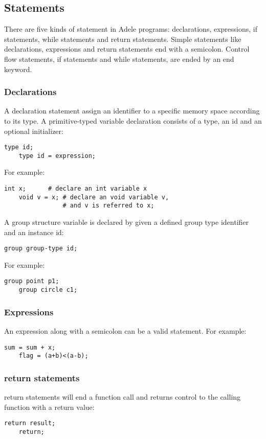 \documentclass[11pt,letterpaper]{article}
\begin{document}
\subsection {Statements}
There are five kinds of statement in Adele programs: declarations, expressions, if statements, while statements and return statements. Simple statements like declarations, expressions and return statements end with a semicolon. Control flow statements, if statements and while statements, are ended by an end keyword.

\subsubsection {Declarations}
A declaration statement assign an identifier to a specific memory space according to its type. A primitive-typed variable declaration consists of a type, an id and an optional initializer:
\begin{lstlisting}[tabsize=4]
	type id;
	type id = expression;
\end{lstlisting}

For example:
\begin{lstlisting}[tabsize=4]
	int x; 		# declare an int variable x
	void v = x; # declare an void variable v, 
                # and v is referred to x;
\end{lstlisting}

A group structure variable is declared by given a defined group type identifier and an instance id:
\begin{lstlisting}[tabsize=4]
	group group-type id;
\end{lstlisting}

For example:
\begin{lstlisting}[tabsize=4]
	group point p1;
	group circle c1;
\end{lstlisting}

\subsubsection {Expressions}
An expression along with a semicolon can be a valid statement. For example:
\begin{lstlisting}[tabsize=4]
	sum = sum + x;
	flag = (a+b)<(a-b);
\end{lstlisting}

\subsubsection {return statements}
return statements will end a function call and returns control to the calling function with a return value:
\begin{lstlisting}[tabsize=4]
	return result;
	return;
\end{lstlisting}
\end{document}
